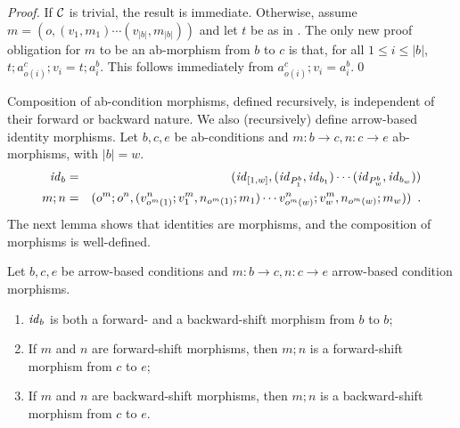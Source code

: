 \begin{proof}
If $\mathcal{C}$ is trivial, the result is immediate. Otherwise, assume $m = (o,(v_1,m_1)\cdots(v_{|b|},m_{|b|}))$ and let $t$ be as in . The only new proof obligation for $m$ to be an ab-morphism from $b$ to $c$ is that, for all $1\leq i\leq |b|$, $t;a^c_{o(i)};v_i=t;a^b_i$. This follows immediately from $a^c_{o(i)};v_i=a^b_i$.\qed
\end{proof}
%
Composition of ab-condition morphisms, defined recursively, is independent of their forward or backward nature. We also (recursively) define arrow-based identity morphisms. Let $b,c,e$ be ab-conditions and $m:b\to c,n:c\to e$ ab-morphisms, with $|b|=w$.
%
\begin{eqnarray}
\id_b & =
  & (\id_{[1,w]},(\id_{P^b_1},\id_{b_1})\cdots 
                 (\id_{P^b_w},\id_{b_w})) \\
  \eqlabel{id-morphism}
m;n & =
  & (o^m;o^n,(v^n_{o^m(1)};v^m_1,n_{o^m(1)};m_1)\cdots 
                v^n_{o^m(w)};v^m_w,n_{o^m(w)};m_w)) \enspace.
 \eqlabel{morphism composition}
\end{eqnarray}
%
The next lemma shows that identities are morphisms, and the composition of morphisms is well-defined.

\begin{lemma}
Let $b,c,e$ be arrow-based conditions and $m:b\to c,n:c\to e$ arrow-based condition morphisms.
\begin{enumerate}[topsep=\smallskipamount]
\item $\mathit{id}_b$ is both a forward- and a backward-shift morphism from $b$ to $b$;
\item If $m$ and $n$ are forward-shift morphisms, then $m;n$ is a forward-shift morphism from $c$ to $e$;
\item If $m$ and $n$ are backward-shift morphisms, then $m;n$ is a backward-shift morphism from $c$ to $e$.
\end{enumerate}
\end{lemma}

